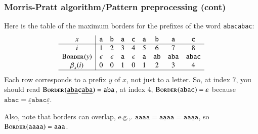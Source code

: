 %
\begin{frame}
\frametitle{Morris-Pratt algorithm/Pattern preprocessing (cont)}

Here is the table of the maximum borders for the prefixes of the word
\texttt{abacabac}:
\[
\begin{array}{c|ccccccccc|}
x & \texttt{a} & \texttt{b} & \texttt{a} & \texttt{c}
 & \texttt{a} & \texttt{b} & \texttt{a} & \texttt{c}\\
\hline
  i
& 1 & 2 & 3 & 4 & 5 & 6 & 7 & 8\\
  \textsc{Border}^{}(y)
& \epsilon & \epsilon & \texttt{a}
& \epsilon & \texttt{a} & \texttt{ab} & \texttt{aba} & \texttt{abac}\\
  \beta_{x}^{}(i)
& 0 & 0 & 1 & 0 & 1 & 2 & 3 & 4\\
\hline
\end{array}
\]
Each row corresponds to a prefix \(y\) of \(x\), not just to a
letter. So, at index \(7\), you should read \(
\textsc{Border}^{}(\underline{\texttt{aba}}\texttt{c}\underline{\texttt{aba}})
= \texttt{aba} \), at index \(4\), \(\textsc{Border}^{}(\texttt{abac}) =
\varepsilon\) because \(\texttt{abac} =
\underline{\varepsilon}\texttt{abac}\underline{\varepsilon}\).

\bigskip

\noindent Also, note that borders can overlap, e.g.,. \(\texttt{aaaa}
= \underline{\texttt{aaa}}\texttt{a} =
\texttt{a}\underline{\texttt{aaa}}\), so \(\textsc{Border}^{}(\texttt{aaaa}) =
\texttt{aaa}\).

\end{frame}

